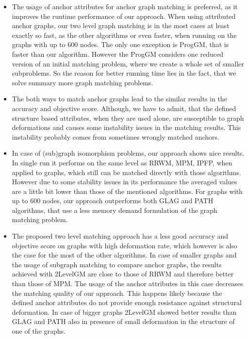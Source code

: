 \begin{itemize}
\item The usage of anchor attributes for anchor graph matching is preferred, as it improves the runtime performance of our approach. 
When using attributed anchor graphs, our two level graph matching is in the most cases at least exactly so fast, as the other algorithms or even faster, when running on the graphs with up to $600$ nodes. The only one exception is ProgGM, that is faster than our algorithm. However the ProgGM considers one reduced version of an initial matching problem, where we create a whole set of smaller subproblems. So the reason for better running time lies in the fact, that we solve summary more graph matching problems.
\item The both ways to match anchor graphs lead to the similar results in the accuracy and objective score. Although, we have to admit, that the defined structure based attributes, when they are used alone, are susceptible to graph deformations and causes some instability issues in the matching results. This instability probably comes from sometimes wrongly matched anchors.
\item In case of (sub)graph isomorphism problems, our approach shows nice results. In single run it performs on the same level as RRWM, MPM, IPFP, when applied to graphs, which still can be matched directly with those algorithms. However due to some stability issues in its performance the averaged values are a little bit lower than those of the mentioned algorithms. For graphs with up to $600$ nodes, our approach outperforms both GLAG and PATH algorithms, that use a less memory demand formulation of the graph matching problem.
\item The proposed two level matching approach has a less good accuracy and objective score on graphs with high deformation rate, which however is also the case for the most of the other algorithms. In case of smaller graphs and the usage of subgraph matching to compare anchor graphs, the results achieved with 2LevelGM are close to those of RRWM and therefore better than those of MPM. The usage of the anchor attributes in this case decreases the matching quality of our approach.  This happens likely because the defined anchor attributes do not provide enough resistance against structural deformation. In case of bigger graphs 2LevelGM showed better results than GLAG and PATH also in presence of small deformation in the structure of one of the graphs.

\end{itemize}
